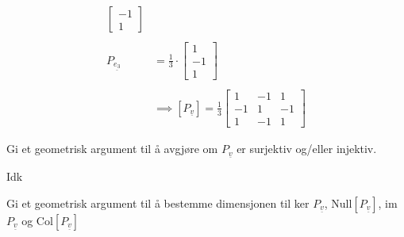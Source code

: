 \documentclass[11pt, a4paper, norsk]{NTNUoving}
\begin{document}
\begin{oppgave}
\begin{punkt}
\begin{align*}
\begin{bmatrix}
                        -1 \\
                        1
                    \end{bmatrix}
                    \\
                    \\
                        P_{\underline{e_3}} &= \frac{1}{3} \cdot \begin{bmatrix}
                            1 \\
                            -1 \\
                            1
                        \end{bmatrix}
                        \\
                        \\
                                            &\implies [P_{\underline{v}}] = \frac{1}{3} \begin{bmatrix}
                                                1 & -1 & 1 \\
                                                -1 & 1 & -1 \\
                                                1 & -1 & 1
                                            \end{bmatrix}
            \end{align*}
        \end{punkt}
        \begin{punkt}
            Gi et geometrisk argument til å avgjøre om $P_{\underline{v}}$ er surjektiv og/eller injektiv.

            Idk
        \end{punkt}
        \begin{punkt}
            Gi et geometrisk argument til å bestemme dimensjonen til ker $P_{\underline{v}}$, Null$[P_{\underline{v}}]$, im$P_{\underline{v}}$ og Col$[P_{\underline{v}}]$
            

\end{punkt}
\end{oppgave}
\end{document}
